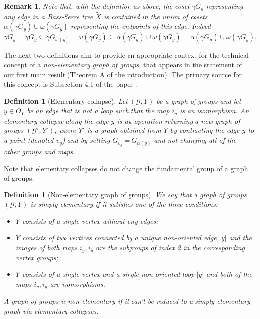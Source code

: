 \documentclass[12pt, a4paper]{article}
\newcommand{\8}{\infty}
\newcommand{\abs}[1]{\left| #1 \right|}
\theoremstyle{break}
\newtheorem{rk}[thm]{Remark}
\theoremstyle{defbreak}
\newtheorem{df}[thm]{Definition}
\newcommand{\ol}[1]{\overline{#1}}
\newcommand{\wtl}[1]{\widetilde{#1}}
\begin{document}
\begin{rk}\label{remark:containment_of_edge}
    Note that, with the definition as above, the coset $\gamma G_y$ representing any edge in a Bass-Serre tree $\wtl{X}$ is contained in the union of cosets $\alpha(\gamma G_y) \cup \omega(\gamma G_y)$ representing the endpoints of this edge. Indeed
    $$\gamma G_y = \gamma G_{\hat{y}} \subseteq \gamma G_{\omega(\hat{y})} = \omega(\gamma G_{\hat{y}}) \subseteq \alpha(\gamma G_{\hat{y}})\cup \omega(\gamma G_{\hat{y}}) = \alpha(\gamma G_{y})\cup \omega(\gamma G_{y}).$$
\end{rk}

The next two definitions aim to provide an appropriate context for the technical concept of a {\it non-elementary graph of groups}, that appears in the statement of our first main result (Theorem A of the introduction). The primary source for this concept is Subsection 4.1 of the paper \cite{dense-amalgam}.\medskip

\begin{df}[Elementary collapse]
    Let $(\mathcal{G},Y)$ be a graph of groups and let $y\in O_Y$ be an edge that is not a loop such that the map $i_y$ is an isomorphism. An \textit{elementary collapse} along the edge $y$ is an operation returning a new graph of groups $(\mathcal{G}',Y')$, where $Y'$ is a graph obtained from $Y$ by contracting the edge $y$ to a point (denoted $v_y$) and by setting $G_{v_y} = G_{\alpha(y)}$ and not changing all of the other groups and maps.
\end{df}

Note that elementary collapses do not change the fundamental group of a graph of groups.\medskip

\begin{df}[Non-elementary graph of groups]\label{Definition:non-elementary_gog}
    We say that a graph of groups $(\mathcal{G},Y)$ is \textit{simply elementary} if it satisfies one of the three conditions:
    \begin{itemize}
        \item $Y$ consists of a single vertex without any edges;
        \item $Y$ consists of two vertices connected by a unique non-oriented edge $\abs{y}$ and the images of both maps $i_y, i_{\ol{y}}$ are the subgroups of index 2
        in the corresponding vertex groups;
        \item $Y$ consists of a single vertex and a single non-oriented loop $\abs{y}$ and both of the maps $i_y, i_{\ol{y}}$ are isomorphisms.
    \end{itemize}
    A graph of groups is \textit{non-elementary} if it can't be reduced to a simply elementary graph via elementary collapses.
\end{df}
\end{document}
